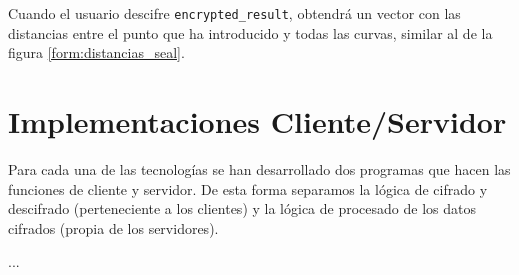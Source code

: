 Cuando el usuario descifre \verb|encrypted_result|, obtendrá un vector con las distancias entre el punto que ha introducido y todas las curvas, similar al de la figura \ref{form:distancias_seal}.


\section{Implementaciones Cliente/Servidor}

Para cada una de las tecnologías se han desarrollado dos programas que hacen las funciones de cliente y servidor. De esta forma separamos la lógica de cifrado y descifrado (perteneciente a los clientes) y la lógica de procesado de los datos cifrados (propia de los servidores).

...

